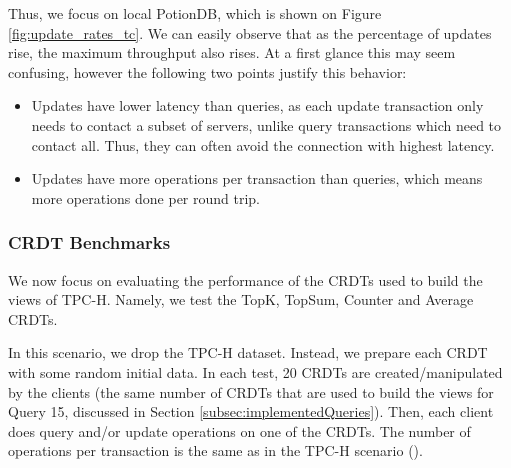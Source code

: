 \documentclass{vldb}
\newcommand{\grumbler}[2]{{\color{red}{\bf #1:} #2}}
\renewcommand{\grumbler}[2]{}
\newcommand{\andre}[1]{\grumbler{andre}{#1}}
\begin{document}
Thus, we focus on local PotionDB, which is shown on Figure \ref{fig:update_rates_tc}.
We can easily observe that as the percentage of updates rise, the maximum throughput also rises.
At a first glance this may seem confusing, however the following two points justify this behavior:
\begin{itemize}
	\item Updates have lower latency than queries, as each update transaction only needs to contact a subset of servers, unlike query transactions which need to contact all. Thus, they can often avoid the connection with highest latency.
	\item Updates have more operations per transaction than queries, which means more operations done per round trip.
\end{itemize}

\andre{Should I mention that a lot less clients are needed to sature the server, the higher the update rate is? (mainly on scenarios without latency)}
\andre{Probably some concluding note that reffers that for PotionDB's intented usages it is likely that updates are much less frequent than queries, or maybe even that updates could maybe be delayed?}

\subsubsection{CRDT Benchmarks}

\andre{Note: On the graphs here I forgot to put "Latency per transaction (ms)" instead of just "Latency (ms)"... will fix that when we do a final version of those graphs}

We now focus on evaluating the performance of the CRDTs used to build the views of TPC-H.
Namely, we test the TopK, TopSum, Counter and Average CRDTs.
\andre{TODO: Maybe I should test embedded maps too? Since they are used to ``hold'' multiple CRDTs in Q5, acting as a group by.}

In this scenario, we drop the TPC-H dataset.
Instead, we prepare each CRDT with some random initial data.
In each test, 20 CRDTs are created/manipulated by the clients (the same number of CRDTs that are used to build the views for Query 15, discussed in Section \ref{subsec:implementedQueries}).
Then, each client does query and/or update operations on one of the CRDTs.
The number of operations per transaction is the same as in the TPC-H scenario (\andre{Do I need to define this in the TPC-H scenario?}).
\end{document}
